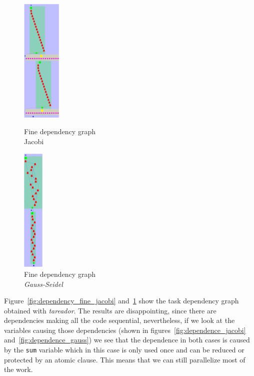 \begin{figure}[H]
    \begin{minipage}{0.5\textwidth}
        \centering
        \includegraphics[height=6cm]{dependency_fine_jacobi.png}
        \caption{Fine dependency graph \\ Jacobi}%
        \label{fig:dependency_fine_jacobi}
    \end{minipage}
    \begin{minipage}{0.5\textwidth}
        \centering
        \includegraphics[height=6cm]{dependency_fine_gauss.png}
        \caption{Fine dependency graph \\ \emph{Gauss-Seidel}}%
        \label{fig:dependency_fine_gauss}
    \end{minipage}
\end{figure}

Figure~\ref{fig:dependency_fine_jacobi} and~\ref{fig:dependency_fine_gauss} show the
task dependency graph obtained with \emph{tareador}. The results are disappointing, since
there are dependencies making all the code sequential, nevertheless, if we look at the
variables causing those dependencies (shown in figures~\ref{fig:dependence_jacobi}
and~\ref{fig:dependence_gauss}) we see that the dependence in both cases is caused by
the \texttt{sum} variable which in this case is only used once and can be reduced or
protected by an atomic clause. This means that we can still parallelize most of the
work.

